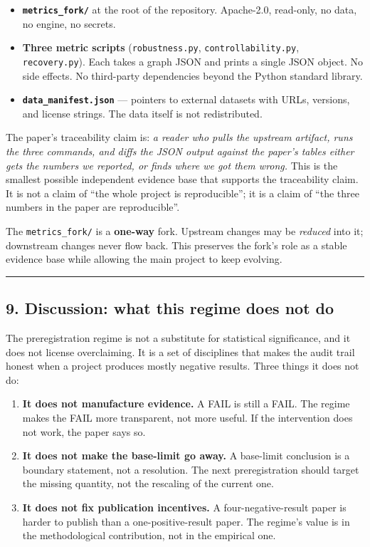 \documentclass[
]{article}
\providecommand{\tightlist}{%
  \setlength{\itemsep}{0pt}\setlength{\parskip}{0pt}}
\begin{document}
\begin{itemize}
\tightlist
\item
  \textbf{\texttt{metrics\_fork/}} at the root of the repository.
  Apache-2.0, read-only, no data, no engine, no secrets.
\item
  \textbf{Three metric scripts} (\texttt{robustness.py},
  \texttt{controllability.py}, \texttt{recovery.py}). Each takes a graph
  JSON and prints a single JSON object. No side effects. No third-party
  dependencies beyond the Python standard library.
\item
  \textbf{\texttt{data\_manifest.json}} --- pointers to external
  datasets with URLs, versions, and license strings. The data itself is
  not redistributed.
\end{itemize}

The paper's traceability claim is: \emph{a reader who pulls the upstream
artifact, runs the three commands, and diffs the JSON output against the
paper's tables either gets the numbers we reported, or finds where we
got them wrong.} This is the smallest possible independent evidence base
that supports the traceability claim. It is not a claim of ``the whole
project is reproducible''; it is a claim of ``the three numbers in the
paper are reproducible''.

The \texttt{metrics\_fork/} is a \textbf{one-way} fork. Upstream changes
may be \emph{reduced} into it; downstream changes never flow back. This
preserves the fork's role as a stable evidence base while allowing the
main project to keep evolving.

\begin{center}\rule{0.5\linewidth}{0.5pt}\end{center}

\subsection{9. Discussion: what this regime does not
do}\label{discussion-what-this-regime-does-not-do}

The preregistration regime is not a substitute for statistical
significance, and it does not license overclaiming. It is a set of
disciplines that makes the audit trail honest when a project produces
mostly negative results. Three things it does not do:

\begin{enumerate}
\def\labelenumi{\arabic{enumi}.}
\tightlist
\item
  \textbf{It does not manufacture evidence.} A FAIL is still a FAIL. The
  regime makes the FAIL more transparent, not more useful. If the
  intervention does not work, the paper says so.
\item
  \textbf{It does not make the base-limit go away.} A base-limit
  conclusion is a boundary statement, not a resolution. The next
  preregistration should target the missing quantity, not the rescaling
  of the current one.
\item
  \textbf{It does not fix publication incentives.} A
  four-negative-result paper is harder to publish than a
  one-positive-result paper. The regime's value is in the methodological
  contribution, not in the empirical one.
\end{enumerate}
\end{document}
